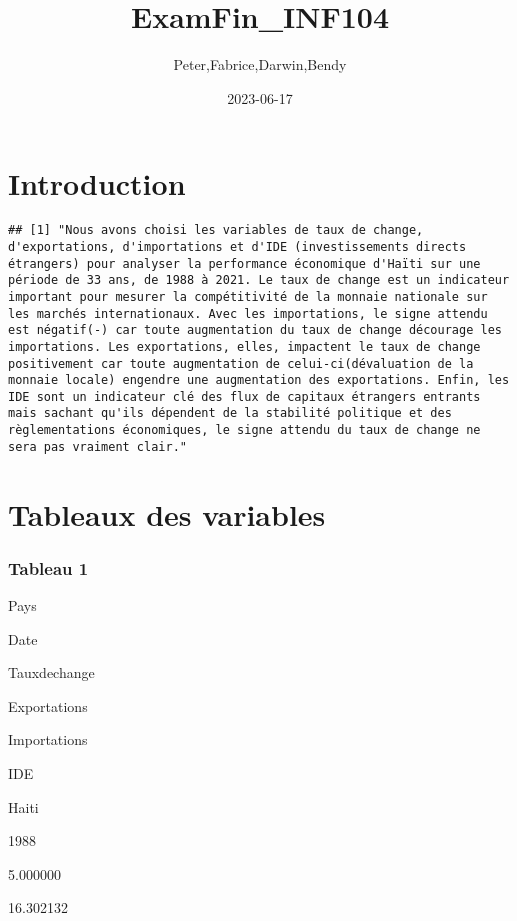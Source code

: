 \documentclass[
]{article}
\title{ExamFin\_INF104}
\author{Peter,Fabrice,Darwin,Bendy}
\date{2023-06-17}
\begin{document}
\maketitle

\hypertarget{introduction}{%
\section{Introduction}\label{introduction}}

\begin{verbatim}
## [1] "Nous avons choisi les variables de taux de change, d'exportations, d'importations et d'IDE (investissements directs étrangers) pour analyser la performance économique d'Haïti sur une période de 33 ans, de 1988 à 2021. Le taux de change est un indicateur important pour mesurer la compétitivité de la monnaie nationale sur les marchés internationaux. Avec les importations, le signe attendu est négatif(-) car toute augmentation du taux de change décourage les importations. Les exportations, elles, impactent le taux de change positivement car toute augmentation de celui-ci(dévaluation de la monnaie locale) engendre une augmentation des exportations. Enfin, les IDE sont un indicateur clé des flux de capitaux étrangers entrants mais sachant qu'ils dépendent de la stabilité politique et des règlementations économiques, le signe attendu du taux de change ne sera pas vraiment clair."
\end{verbatim}

\hypertarget{tableaux-des-variables}{%
\section{Tableaux des variables}\label{tableaux-des-variables}}

\hypertarget{tableau-1}{%
\subsubsection{Tableau 1}\label{tableau-1}}

Pays

Date

Tauxdechange

Exportations

Importations

IDE

Haiti

1988

5.000000

16.302132
\end{document}
